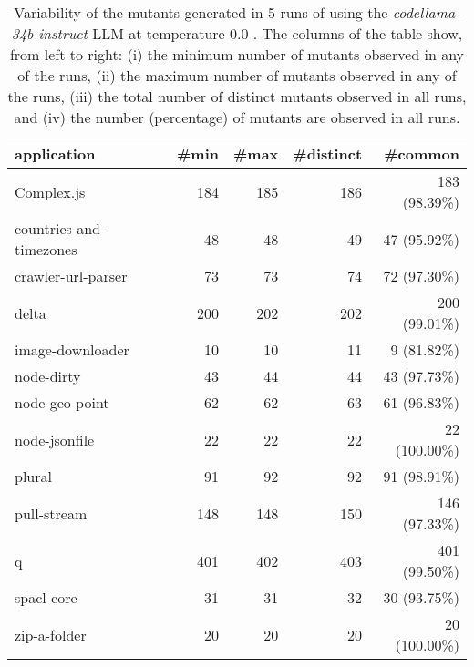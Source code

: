 
\begin{table}[hbt!]
\centering
{\footnotesize
\begin{tabular}{l|r|r|r|r}

{\bf application}  & {\bf \#min} &  {\bf \#max} &  {\bf \#distinct} & {\bf \#common}\\
\hline
Complex.js & 184 & 185 & 186 & 183 (98.39\%) \\ 
countries-and-timezones & 48 & 48 & 49 & 47 (95.92\%) \\ 
crawler-url-parser & 73 & 73 & 74 & 72 (97.30\%) \\ 
delta & 200 & 202 & 202 & 200 (99.01\%) \\ 
image-downloader & 10 & 10 & 11 & 9 (81.82\%) \\ 
node-dirty & 43 & 44 & 44 & 43 (97.73\%) \\ 
node-geo-point & 62 & 62 & 63 & 61 (96.83\%) \\ 
node-jsonfile & 22 & 22 & 22 & 22 (100.00\%) \\ 
plural & 91 & 92 & 92 & 91 (98.91\%) \\ 
pull-stream & 148 & 148 & 150 & 146 (97.33\%) \\ 
q & 401 & 402 & 403 & 401 (99.50\%) \\ 
spacl-core & 31 & 31 & 32 & 30 (93.75\%) \\ 
zip-a-folder & 20 & 20 & 20 & 20 (100.00\%) \\ 
\end{tabular}
}
\caption{
  Variability of the mutants generated in 5 runs of \ToolName using the \textit{codellama-34b-instruct} LLM
       at temperature 0.0 . The columns of the table show, from left to right:
    (i) the minimum number of mutants observed in any of the runs,
    (ii) the maximum number of mutants observed in any of the runs,
    (iii) the total number of distinct mutants observed in all runs, and
    (iv) the number (percentage) of mutants are observed in all runs.
}
\label{table:Variability_codellama-34b-instruct_0.0}
\end{table}